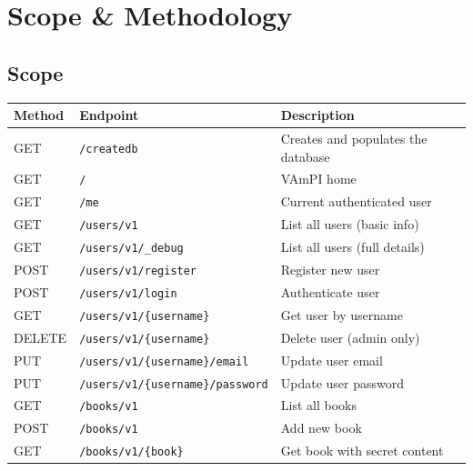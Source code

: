 \documentclass[11pt,a4paper]{article}
\begin{document}
\section{Scope \& Methodology}

\subsection{Scope}

\begin{center}
\begin{tabularx}{\textwidth}{llX}
  \toprule
  \textbf{Method} & \textbf{Endpoint} & \textbf{Description} \\
  \midrule
  GET  & \texttt{/createdb}                       & Creates and populates the database \\
  GET  & \texttt{/}                               & VAmPI home \\
  GET  & \texttt{/me}                             & Current authenticated user \\
  GET  & \texttt{/users/v1}                       & List all users (basic info) \\
  GET  & \texttt{/users/v1/\_debug}               & List all users (full details) \\
  POST & \texttt{/users/v1/register}              & Register new user \\
  POST & \texttt{/users/v1/login}                 & Authenticate user \\
  GET  & \texttt{/users/v1/\{username\}}          & Get user by username \\
  DELETE & \texttt{/users/v1/\{username\}}        & Delete user (admin only) \\
  PUT  & \texttt{/users/v1/\{username\}/email}    & Update user email \\
  PUT  & \texttt{/users/v1/\{username\}/password} & Update user password \\
  GET  & \texttt{/books/v1}                       & List all books \\
  POST & \texttt{/books/v1}                       & Add new book \\
  GET  & \texttt{/books/v1/\{book\}}              & Get book with secret content \\
  \bottomrule
\end{tabularx}
\end{center}
\end{document}
